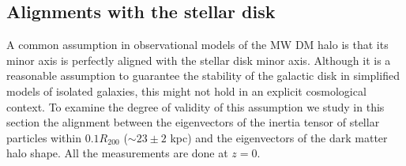 \documentclass[a4paper,fleqn,usenatbib]{mnras}
\begin{document}




\subsection{Alignments with the stellar disk}


A common assumption in observational models of the MW DM halo is that
its minor axis is perfectly aligned with the stellar disk minor axis.
Although it is a reasonable assumption to guarantee the stability of
the galactic disk in simplified models of isolated galaxies, this
might not hold in an explicit cosmological context. 
To examine the degree of validity of this assumption we study in this
section the alignment between the eigenvectors of the inertia tensor of
stellar particles within $0.1R_{200}$ ($\sim 23\pm 2$ kpc) and the
eigenvectors of the dark matter halo shape.
All the measurements are done at $z=0$.
\end{document}

